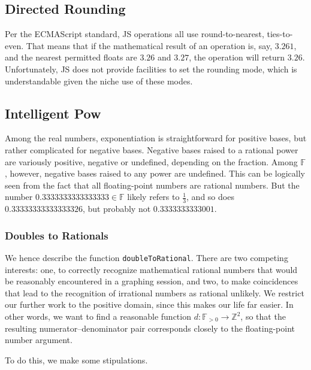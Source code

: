 \documentclass{article}
\newcommand{\finitefp}{\mathbb{F}}
\begin{document}
\subsection{Directed Rounding}

Per the ECMAScript standard, JS operations all use round-to-nearest, ties-to-even. That means that if the mathematical result of an operation is, say, $3.261$, and the nearest permitted floats are $3.26$ and $3.27$, the operation will return $3.26$. Unfortunately, JS does not provide facilities to set the rounding mode, which is understandable given the niche use of these modes.

\subsection{Intelligent Pow}

Among the real numbers, exponentiation is straightforward for positive bases, but rather complicated for negative bases. Negative bases raised to a rational power are variously positive, negative or undefined, depending on the fraction. Among $\finitefp$, however, negative bases raised to any power are undefined. This can be logically seen from the fact that all floating-point numbers are rational numbers. But the number $0.3333333333333333\in\finitefp$ likely refers to $\frac{1}{3}$, and so does $0.33333333333333326$, but probably not $0.3333333333001$.

\subsubsection{Doubles to Rationals}

We hence describe the function \texttt{doubleToRational}. There are two competing interests: one, to correctly recognize mathematical rational numbers that would be reasonably encountered in a graphing session, and two, to make coincidences that lead to the recognition of irrational numbers as rational unlikely. We restrict our further work to the positive domain, since this makes our life far easier. In other words, we want to find a reasonable function $d : \finitefp_{>0} \to \mathbb{Z}^2$, so that the resulting numerator–denominator pair corresponds closely to the floating-point number argument.

To do this, we make some stipulations.
\end{document}
